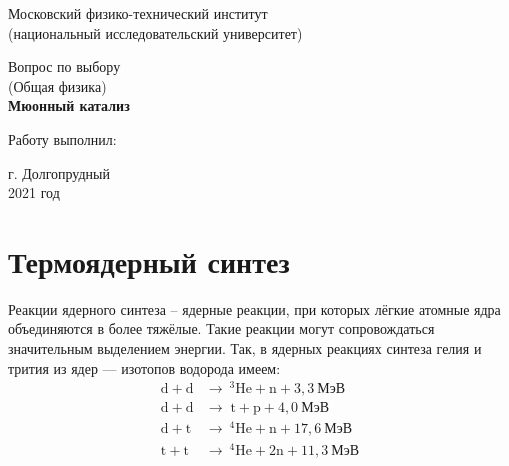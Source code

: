 \documentclass[12pt]{kiarticle} %
\begin{document}
	
	\begin{titlepage}
	\begin{center}
		\large 	Московский физико-технический институт \\
		(национальный исследовательский университет) \\
		\vspace{0.2cm}
		
		\vspace{4.5cm}
		Вопрос по выбору \\ \vspace{0.2cm}
		\large (Общая физика) \\ \vspace{0.2cm}
		\LARGE \textbf{Мюонный катализ}
	\end{center}
	\vspace{2.3cm} \large
	
	\begin{center}
		Работу выполнил: \\
		\vspace{10mm}		
		
	\end{center}
	
	\begin{center} \vspace{75mm}
		г. Долгопрудный \\
		2021 год
	\end{center}
\end{titlepage}


\section{Термоядерный синтез}
Реакции ядерного синтеза -- ядерные реакции, при которых лёгкие атомные ядра объединяются в более тяжёлые. Такие реакции могут сопровождаться значительным выделением энергии. Так, в ядерных реакциях синтеза гелия и трития из ядер --- изотопов водорода имеем:
\begin{align}
\mathrm{d} + \mathrm{d} &\longrightarrow \ {}^3\mathrm{He} + \mathrm{n} + 3,3 \ \text{МэВ}\\
\mathrm{d}+\mathrm{d} &\longrightarrow \; \mathrm{t}+\mathrm{p}+4,0  \ \text{МэВ} \\
\mathrm{d}+\mathrm{t} &\longrightarrow \ {}^{4} \mathrm{He}+\mathrm{n}+17,6 \ \text{МэВ} \\
\mathrm{t}+\mathrm{t} &\longrightarrow \ {}^{4} \mathrm{He}+2 \mathrm{n}+11,3 \ \text{МэВ}
\end{align}
\end{document}

